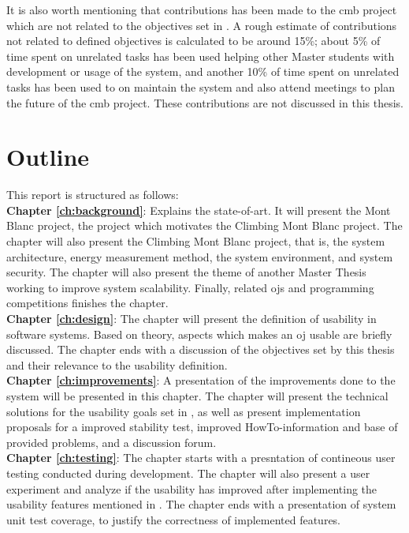 It is also worth mentioning that contributions has been made to the \gls{cmb} project which are not related to the objectives set in . A rough estimate of contributions not related to defined objectives is calculated to be around 15\%; about 5\% of time spent on unrelated tasks has been used helping other Master students with development or usage of the system, and another 10\% of time spent on unrelated tasks has been used to on maintain the system and also attend meetings to plan the future of the \gls{cmb} project. These contributions are not discussed in this thesis.



\section{Outline}
\label{sec:out}
This report is structured as follows:\\

\textbf{Chapter \ref{ch:background}}: Explains the state-of-art. It will present the Mont Blanc project, the project which motivates the Climbing Mont Blanc project. The chapter will also present the Climbing Mont Blanc project, that is, the system architecture, energy measurement method, the system environment, and system security. The chapter will also present the theme of another Master Thesis working to improve system scalability. Finally, related \glspl{oj} and programming competitions finishes the chapter. \\

\textbf{Chapter \ref{ch:design}}: The chapter will present the definition of usability in software systems. Based on theory, aspects which makes an \gls{oj} usable are briefly discussed. The chapter ends with a discussion of the objectives set by this thesis and their relevance to the usability definition. \\

\textbf{Chapter \ref{ch:improvements}}: A presentation of the improvements done to the system will be presented in this chapter. The chapter will present the technical solutions for the usability goals set in , as well as present implementation proposals for a improved stability test, improved HowTo-information and base of provided problems, and a discussion forum. \\

\textbf{Chapter \ref{ch:testing}}: The chapter starts with a presntation of contineous user testing conducted during development. The chapter will also present a user experiment and analyze if the usability has improved after implementing the usability features mentioned in . The chapter ends with a presentation of system unit test coverage, to justify the correctness of implemented features. \\

